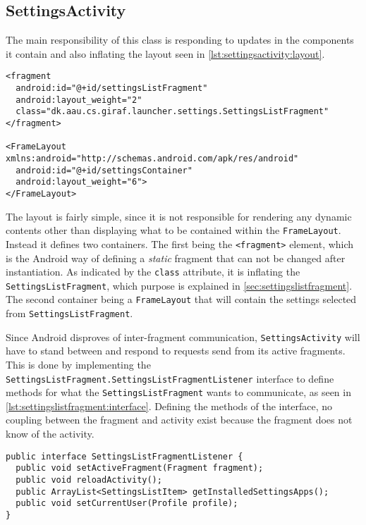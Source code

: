 \subsection{SettingsActivity}\label{sec:sprint3:settings}
The main responsibility of this class is responding to updates in the components it contain and also inflating the layout seen in \cref{lst:settingsactivity:layout}.

\begin{lstlisting}[caption={Excerpt of the layout defined for \lstinline|SettingsActivity|.}, label={lst:settingsactivity:layout}]
<fragment
  android:id="@+id/settingsListFragment"
  android:layout_weight="2"
  class="dk.aau.cs.giraf.launcher.settings.SettingsListFragment"
</fragment>

<FrameLayout xmlns:android="http://schemas.android.com/apk/res/android"
  android:id="@+id/settingsContainer"
  android:layout_weight="6">
</FrameLayout>
\end{lstlisting}

The layout is fairly simple, since it is not responsible for rendering any dynamic contents other than displaying what to be contained within the \lstinline|FrameLayout|.
Instead it defines two containers.
The first being the \lstinline|<fragment>| element, which is the Android way of defining a \textit{static} fragment that can not be changed after instantiation.
As indicated by the \lstinline|class| attribute, it is inflating the \lstinline|SettingsListFragment|, which purpose is explained in \cref{sec:settingslistfragment}.
The second container being a \lstinline|FrameLayout| that will contain the settings selected from \lstinline|SettingsListFragment|.

Since Android disproves of inter-fragment communication, \lstinline|SettingsActivity| will have to stand between and respond to requests send from its active fragments.
This is done by implementing the \lstinline|SettingsListFragment.SettingsListFragmentListener| interface to define methods for what the \lstinline|SettingsListFragment| wants to communicate, as seen in \cref{lst:settingslistfragment:interface}.
Defining the methods of the interface, no coupling between the fragment and activity exist because the fragment does not know of the activity.

\begin{lstlisting}[caption={The interface implemented in \lstinline|SettingsActivity| defined in \lstinline|SettingsListFragment|.}, label={lst:settingslistfragment:interface}]
public interface SettingsListFragmentListener {
  public void setActiveFragment(Fragment fragment);
  public void reloadActivity();
  public ArrayList<SettingsListItem> getInstalledSettingsApps();
  public void setCurrentUser(Profile profile);
}
\end{lstlisting}

